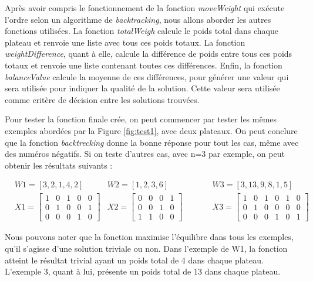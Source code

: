 \documentclass[12pt]{article} %
\begin{document}
Après avoir compris le fonctionnement de la fonction \textit{moveWeight} qui exécute l'ordre selon un algorithme de \textit{backtracking}, nous allons aborder les autres fonctions utilisées. La fonction \textit{totalWeigh} calcule le poids total dans chaque plateau et renvoie une liste avec tous ces poids totaux. La fonction \textit{weightDifference}, quant à elle, calcule la différence de poids entre tous ces poids totaux et renvoie une liste contenant toutes ces différences. Enfin, la fonction \textit{balanceValue} calcule la moyenne de ces différences, pour générer une valeur qui sera utilisée pour indiquer la qualité de la solution. Cette valeur sera utilisée comme critère de décision entre les solutions trouvées. 

Pour tester la fonction finale crée, on peut commencer par tester les mêmes exemples abordées par la Figure \ref{fig:test1}, avec deux plateaux. On peut conclure que la fonction \textit{backtrecking} donne la bonne réponse pour tout les cas, même avec des numéros négatifs. Si on teste d'autres cas, avec n=3 par exemple, on peut obtenir les résultats suivants :  

\vfill

\begin{align*}
    & W1 = [3, 2, 1, 4, 2] &W2 = [1, 2, 3, 6]\;\;\;\;\;\;\;\;\;\; & W3 = [3, 13, 9, 8, 1, 5]\\
    &X1 = \begin{bmatrix}
    1 & 0 & 1 & 0 & 0 \\
    0 & 1 & 0 & 0 & 1 \\
    0 & 0 & 0 & 1 & 0
    \end{bmatrix} 
    &X2 = \begin{bmatrix}
    0 & 0 & 0 & 1 \\
    0 & 0 & 1 & 0 \\
    1 & 1 & 0 & 0
    \end{bmatrix} \;\;\;\;\;\;\;\;\;\;
    &X3 = \begin{bmatrix}
    1 & 0 & 1 & 0 & 1 & 0 \\
    0 & 1 & 0 & 0 & 0 & 0 \\
    0 & 0 & 0 & 1 & 0 & 1
    \end{bmatrix} 
\end{align*}

\vfill

Nous pouvons noter que la fonction maximise l'équilibre dans tous les exemples, qu'il s'agisse d'une solution triviale ou non. Dans l'exemple de W1, la fonction atteint le résultat trivial ayant un poids total de 4 dans chaque plateau. L'exemple 3, quant à lui, présente un poids total de 13 dans chaque plateau.  
\end{document}
